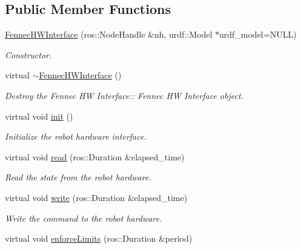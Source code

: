 \subsection*{Public Member Functions}
\begin{DoxyCompactItemize}
\item 
\hyperlink{classfennec__ns_1_1_fennec_h_w_interface_a2efa0dd31094aa112588ba5ca1ff6f69}{Fennec\+H\+W\+Interface} (ros\+::\+Node\+Handle \&nh, urdf\+::\+Model $\ast$urdf\+\_\+model=N\+U\+LL)
\begin{DoxyCompactList}\small\item\em Constructor. \end{DoxyCompactList}\item 
\mbox{\label{classfennec__ns_1_1_fennec_h_w_interface_a26858f1a85875199f276e12d5fe30113}} 
virtual \hyperlink{classfennec__ns_1_1_fennec_h_w_interface_a26858f1a85875199f276e12d5fe30113}{$\sim$\+Fennec\+H\+W\+Interface} ()
\begin{DoxyCompactList}\small\item\em Destroy the Fennec HW Interface\+:\+: Fennec HW Interface object. \end{DoxyCompactList}\item 
virtual void \hyperlink{classfennec__ns_1_1_fennec_h_w_interface_ad5e55d24cc4471e666f2e5e17977ca13}{init} ()
\begin{DoxyCompactList}\small\item\em Initialize the robot hardware interface. \end{DoxyCompactList}\item 
virtual void \hyperlink{classfennec__ns_1_1_fennec_h_w_interface_adb8bbfce4a97c7f0a007a6ddf933be7a}{read} (ros\+::\+Duration \&elapsed\+\_\+time)
\begin{DoxyCompactList}\small\item\em Read the state from the robot hardware. \end{DoxyCompactList}\item 
virtual void \hyperlink{classfennec__ns_1_1_fennec_h_w_interface_a0b68acf47d161d3c7d30d21b35327923}{write} (ros\+::\+Duration \&elapsed\+\_\+time)
\begin{DoxyCompactList}\small\item\em Write the command to the robot hardware. \end{DoxyCompactList}\item 
virtual void \hyperlink{classfennec__ns_1_1_fennec_h_w_interface_a30250e644ed2ef16ee724289c8193066}{enforce\+Limits} (ros\+::\+Duration \&period)

\end{DoxyCompactItemize}
